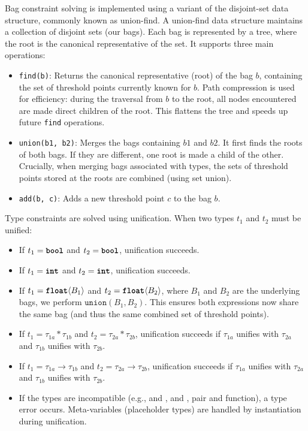 \documentclass[acmsmall,screen,dvipsnames,x11names,nonacm,anonymous,review]{acmart}
\newcommand{\bool}{\text{\ttfamily\bfseries bool}}
\newcommand{\intty}{\text{\ttfamily\bfseries int}}
\newcommand{\float}{\text{\ttfamily\bfseries float}}
\begin{document}
Bag constraint solving is implemented using a variant of the disjoint-set data structure, commonly known as union-find.
A union-find data structure maintains a collection of disjoint sets (our bags). Each bag is represented by a tree, where the root is the canonical representative of the set. It supports three main operations:
\begin{itemize}
    \item \texttt{find(b)}: Returns the canonical representative (root) of the bag $b$, containing the set of threshold points currently known for $b$. Path compression is used for efficiency: during the traversal from $b$ to the root, all nodes encountered are made direct children of the root. This flattens the tree and speeds up future \texttt{find} operations.
    \item \texttt{union(b1, b2)}: Merges the bags containing $b1$ and $b2$. It first finds the roots of both bags. If they are different, one root is made a child of the other. Crucially, when merging bags associated with \float{} types, the sets of threshold points stored at the roots are combined (using set union).
    \item \texttt{add(b, c)}: Adds a new threshold point $c$ to the bag $b$.
\end{itemize}

Type constraints are solved using unification. When two types $t_1$ and $t_2$ must be unified:
\begin{itemize}
    \item If $t_1 = \bool$ and $t_2 = \bool$, unification succeeds.
    \item If $t_1 = \intty$ and $t_2 = \intty$, unification succeeds.
    \item If $t_1 = \float\langle B_1 \rangle$ and $t_2 = \float\langle B_2 \rangle$, where $B_1$ and $B_2$ are the underlying bags, we perform $\texttt{union}(B_1, B_2)$. This ensures both expressions now share the same bag (and thus the same combined set of threshold points).
    \item If $t_1 = \tau_{1a} * \tau_{1b}$ and $t_2 = \tau_{2a} * \tau_{2b}$, unification succeeds if $\tau_{1a}$ unifies with $\tau_{2a}$ and $\tau_{1b}$ unifies with $\tau_{2b}$.
    \item If $t_1 = \tau_{1a} \rightarrow \tau_{1b}$ and $t_2 = \tau_{2a} \rightarrow \tau_{2b}$, unification succeeds if $\tau_{1a}$ unifies with $\tau_{2a}$ and $\tau_{1b}$ unifies with $\tau_{2b}$.
    \item If the types are incompatible (e.g., \bool{} and \float{}, \intty{} and \float{}, pair and function), a type error occurs. Meta-variables (placeholder types) are handled by instantiation during unification.
\end{itemize}
\end{document}
